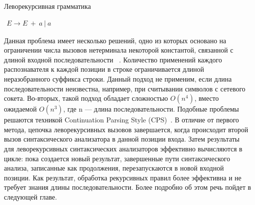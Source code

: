  \begin{listing}
\caption{Леворекурсивная грамматика}
\label{grmG2}
\centering
$\begin{array}{rl}
E \rightarrow E \ + \ a \ | \ a
\end{array}$
 \end{listing}

Данная проблема имеет несколько решений, одно из которых основано на ограничении числа вызовов нетерминала некоторой константой, связанной с длиной входной последовательности ~\cite{ParserComb}. Количество применений каждого распознавателя к каждой позиции в строке ограничивается длиной неразобранного суффикса строки. Данный подход не применим, если длина последовательности неизвестна, например, при считывании символов с сетевого сокета. Во-вторых, такой подход обладает сложностью $O(n^4)$, вместо ожидаемой $O(n^3)$, где n --- длина последовательности. Подобные проблемы решаются техникой Continuation Parsing Style (CPS)~\cite{MemoizationInTopDown}. В отличие от первого метода, цепочка леворекурсивных вызовов завершается, когда происходит второй вызов синтаксического анализатора в данной позиции входа. Затем результаты для леворекурсивных синтаксических анализаторов эффективно вычисляются в цикле: пока создается новый результат, завершенные пути синтаксического анализа, записанные как продолжения, перезапускаются в новой входной позиции. Как результат, обработка рекурсивных правил более эффективна и не требует знания длины последовательности. Более подробно об этом речь пойдет в следующей главе.


